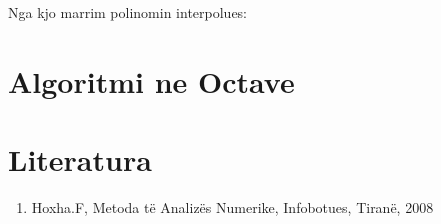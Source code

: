 \documentclass[12pt, margin=1in, a4paper]{article}
\begin{document}
  Nga kjo marrim polinomin interpolues:

  \newpage

\section{Algoritmi ne Octave}
  \newpage

\section{Literatura}
\begin{enumerate}
  \item Hoxha.F, Metoda të Analizës Numerike, Infobotues, Tiranë, 2008
\end{enumerate}
\end{document}
